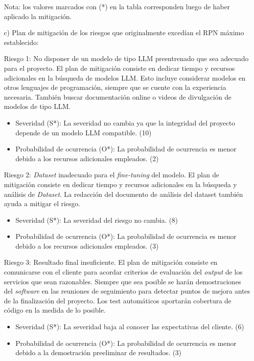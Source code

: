 \documentclass[
11pt, %
]{Clases/charter}
\begin{document}
Nota: los valores marcados con (*) en la tabla corresponden luego de haber aplicado la mitigación.

c) Plan de mitigación de los riesgos que originalmente excedían el RPN máximo establecido:

Riesgo 1: No disponer de un modelo de tipo LLM preentrenado que sea adecuado para el proyecto.
El plan de mitigación consiste en dedicar tiempo y recursos adicionales en la búsqueda de modelos LLM.
Esto incluye considerar modelos en otros lenguajes de programación, siempre que se cuente con la experiencia necesaria.
También buscar documentación online o videos de divulgación de modelos de tipo LLM.
\begin{itemize}
	\item  Severidad (S*): La severidad no cambia ya que la integridad del proyecto depende de un modelo LLM compatible. (10)
	\item  Probabilidad de ocurrencia (O*): La probabilidad de ocurrencia es menor debido a los recursos adicionales empleados. (2)
\end{itemize}

Riesgo 2: \textit{Dataset} inadecuado para el \textit{fine-tuning} del modelo.
El plan de mitigación consiste en dedicar tiempo y recursos adicionales en la búsqueda y análisis de \textit{Dataset}.
La redacción del documento de análisis del dataset también ayuda a mitigar el riesgo.
\begin{itemize}
	\item  Severidad (S*): La severidad del riesgo no cambia. (8)
	\item  Probabilidad de ocurrencia (O*): La probabilidad de ocurrencia es menor debido a los recursos adicionales empleados. (3)
\end{itemize}

Riesgo 3: Resultado final insuficiente.
El plan de mitigación consiste en comunicarse con el cliente para acordar criterios de evaluación del \textit{output} de los servicios que sean razonables.
Siempre que sea posible se harán demostraciones del \textit{software} en las reuniones de seguimiento para detectar puntos de mejora antes de la finalización del proyecto.
Los test automáticos aportarán cobertura de código en la medida de lo posible.

\begin{itemize}
	\item  Severidad (S*): La severidad baja al conocer las expectativas del cliente. (6)
	\item  Probabilidad de ocurrencia (O*): La probabilidad de ocurrencia es menor debido a la demostración preeliminar de resultados. (3)
\end{itemize}
\end{document}
